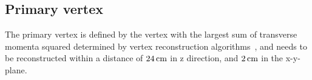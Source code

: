 
\subsection{Primary vertex}
The primary vertex is defined by the vertex with the largest sum of transverse momenta squared determined by vertex reconstruction algorithms~\cite{vertex}, and needs to be reconstructed within a distance of $24\,\text{cm}$ in z direction, and $2\,\text{cm}$ in the x-y-plane.


